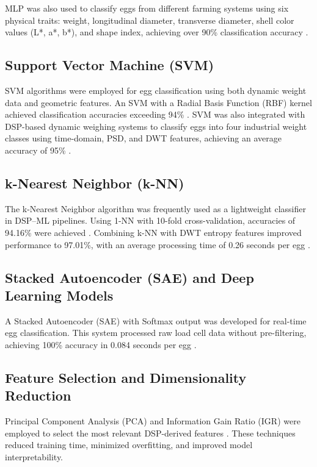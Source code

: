 \documentclass[conference]{IEEEtran}
\begin{document}
	MLP was also used to classify eggs from different farming systems using six physical traits: weight, longitudinal diameter, transverse diameter, shell color values (L*, a*, b*), and shape index, achieving over 90\% classification accuracy \cite{huang2024}.
	
	\subsection{Support Vector Machine (SVM)}
	
	SVM algorithms were employed for egg classification using both dynamic weight data and geometric features. An SVM with a Radial Basis Function (RBF) kernel achieved classification accuracies exceeding 94\% \cite{nasir2018}. SVM was also integrated with DSP-based dynamic weighing systems to classify eggs into four industrial weight classes using time-domain, PSD, and DWT features, achieving an average accuracy of 95\% \cite{secil2020}.
	
	\subsection{k-Nearest Neighbor (k-NN)}
	
	The k-Nearest Neighbor algorithm was frequently used as a lightweight classifier in DSP–ML pipelines. Using 1-NN with 10-fold cross-validation, accuracies of 94.16\% were achieved \cite{nasir2018}. Combining k-NN with DWT entropy features improved performance to 97.01\%, with an average processing time of 0.26 seconds per egg \cite{secil2020}.
	
	\subsection{Stacked Autoencoder (SAE) and Deep Learning Models}
	
	A Stacked Autoencoder (SAE) with Softmax output was developed for real-time egg classification. This system processed raw load cell data without pre-filtering, achieving 100\% accuracy in 0.084 seconds per egg \cite{yabanova2025}.
	
	\subsection{Feature Selection and Dimensionality Reduction}
	
	Principal Component Analysis (PCA) and Information Gain Ratio (IGR) were employed to select the most relevant DSP-derived features \cite{asadi2010}\cite{nasir2018}. These techniques reduced training time, minimized overfitting, and improved model interpretability.
\end{document}
